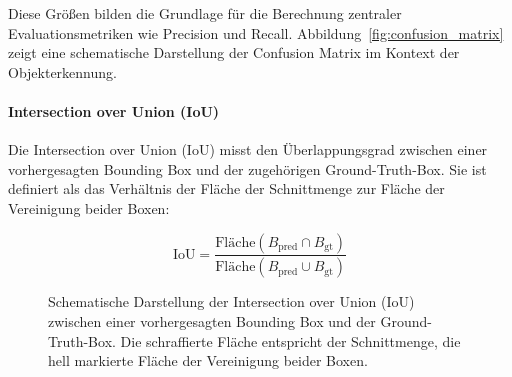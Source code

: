 Diese Größen bilden die Grundlage für die Berechnung zentraler
Evaluationsmetriken wie Precision und Recall. Abbildung~\ref{fig:confusion_matrix} zeigt eine schematische Darstellung der Confusion Matrix im Kontext der
Objekterkennung.

\paragraph{Intersection over Union (IoU)}
Die Intersection over Union (IoU) misst den Überlappungsgrad zwischen einer
vorhergesagten Bounding Box und der zugehörigen Ground-Truth-Box. Sie ist definiert
als das Verhältnis der Fläche der Schnittmenge zur Fläche der Vereinigung beider
Boxen:

\begin{equation}
    \text{IoU} = \frac{\text{Fläche}(B_{\text{pred}} \cap B_{\text{gt}})}
    {\text{Fläche}(B_{\text{pred}} \cup B_{\text{gt}})}
\end{equation}

\begin{figure}[H]
    \centering
    \caption{Schematische Darstellung der Intersection over Union (IoU) zwischen einer vorhergesagten Bounding Box und der Ground-Truth-Box. Die schraffierte Fläche entspricht der Schnittmenge, die hell markierte Fläche der Vereinigung beider Boxen.}
    \label{fig:iou_visualization}
\end{figure}


